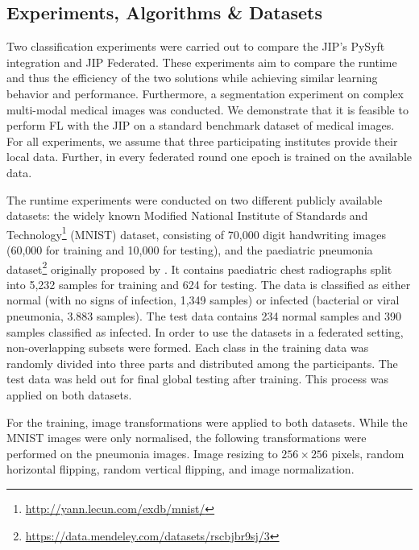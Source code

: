\subsection{Experiments, Algorithms \& Datasets}
\label{subsec:MethodsExperiments}

Two classification experiments were carried out to compare the JIP's PySyft integration and JIP Federated. These experiments aim to compare the runtime and thus the efficiency of the two solutions while achieving similar learning behavior and performance. Furthermore, a segmentation experiment on complex multi-modal medical images was conducted. 
We demonstrate that it is feasible to perform FL with the JIP on a standard benchmark dataset of medical images.
For all experiments, we assume that three participating institutes provide their local data. Further, in every federated round one epoch is trained on the available data.

The runtime experiments were conducted on two different publicly available datasets: the widely known Modified National Institute of Standards and Technology\footnote{\url{http://yann.lecun.com/exdb/mnist/}} (MNIST) dataset, consisting of 70,000 digit handwriting images (60,000 for training and 10,000 for testing), and the paediatric pneumonia dataset\footnote{\url{https://data.mendeley.com/datasets/rscbjbr9sj/3}} originally proposed by \cite{Kermany2018IdentifyingLearning}. It contains paediatric chest radiographs split into 5,232 samples for training and 624 for testing. The data is classified as either normal (with no signs of infection, 1,349 samples) or infected (bacterial or viral pneumonia, 3.883 samples). The test data contains 234 normal samples and 390 samples classified as infected. In order to use the datasets in a federated setting, non-overlapping subsets were formed. Each class in the training data was randomly divided into three parts and distributed among the participants. The test data was held out for final global testing after training. This process was applied on both datasets.

For the training, image transformations were applied to both datasets. While the MNIST images were only normalised, the following transformations were performed on the pneumonia images.
Image resizing to $256 \times 256$ pixels,
random horizontal flipping,
random vertical flipping,
and image normalization.


